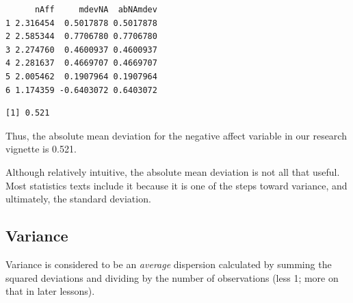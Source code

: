 \documentclass[
  11pt,
]{book}
\newenvironment{Shaded}{\begin{snugshade}}{\end{snugshade}}
\newcommand{\AttributeTok}[1]{\textcolor[rgb]{0.77,0.63,0.00}{#1}}
\newcommand{\ConstantTok}[1]{\textcolor[rgb]{0.00,0.00,0.00}{#1}}
\newcommand{\DecValTok}[1]{\textcolor[rgb]{0.00,0.00,0.81}{#1}}
\newcommand{\FunctionTok}[1]{\textcolor[rgb]{0.00,0.00,0.00}{#1}}
\newcommand{\NormalTok}[1]{#1}
\newcommand{\OtherTok}[1]{\textcolor[rgb]{0.56,0.35,0.01}{#1}}
\newcommand{\SpecialCharTok}[1]{\textcolor[rgb]{0.00,0.00,0.00}{#1}}
\begin{document}
\begin{Shaded}
\end{Shaded}

\begin{verbatim}
      nAff     mdevNA  abNAmdev
1 2.316454  0.5017878 0.5017878
2 2.585344  0.7706780 0.7706780
3 2.274760  0.4600937 0.4600937
4 2.281637  0.4669707 0.4669707
5 2.005462  0.1907964 0.1907964
6 1.174359 -0.6403072 0.6403072
\end{verbatim}

\begin{Shaded}
\end{Shaded}

\begin{verbatim}
[1] 0.521
\end{verbatim}

Thus, the absolute mean deviation for the negative affect variable in our research vignette is 0.521.

Although relatively intuitive, the absolute mean deviation is not all that useful. Most statistics texts include it because it is one of the steps toward variance, and ultimately, the standard deviation.

\hypertarget{variance}{%
\subsection{Variance}\label{variance}}

Variance is considered to be an \emph{average} dispersion calculated by summing the squared deviations and dividing by the number of observations (less 1; more on that in later lessons).
\end{document}
